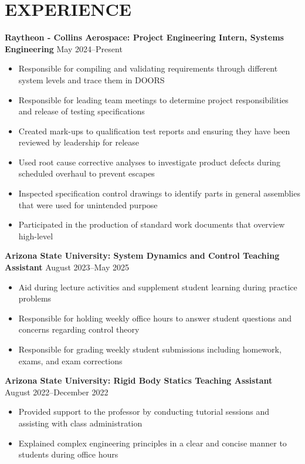 \documentclass{article}
\begin{document}
	\section{EXPERIENCE}
	\textbf{Raytheon - Collins Aerospace: Project Engineering Intern, Systems Engineering}
	\hfill
	\vspace{0.5em}
	May 2024--Present
	\begin{itemize}
		\item{ Responsible for compiling and validating requirements through different system levels and trace them in DOORS}
		\item{ Responsible for leading team meetings to determine project responsibilities and release of testing specifications}
		\item{ Created mark-ups to qualification test reports and ensuring they have been reviewed by leadership for release}
		\item{ Used root cause corrective analyses to investigate product defects during scheduled overhaul to prevent escapes}
		\item{ Inspected specification control drawings to identify parts in general assemblies that were used for unintended purpose}
		\item{ Participated in the production of standard work documents that overview high-level }
	\end{itemize}
	\vspace{1em}
	\textbf{Arizona State University: System Dynamics and Control Teaching Assistant}
	\hfill
	\vspace{0.5em}
	August 2023--May 2025
	\begin{itemize}
		\item{ Aid during lecture activities and supplement student learning during practice problems}
		\item{ Responsible for holding weekly office hours to answer student questions and concerns regarding control theory}
		\item{ Responsible for grading weekly student submissions including homework, exams, and exam corrections}
	\end{itemize}
	\vspace{1em}
	\textbf{Arizona State University: Rigid Body Statics Teaching Assistant}
	\hfill
	\vspace{0.5em}
	August 2022--December 2022
	\begin{itemize}
		\item{ Provided support to the professor by conducting tutorial sessions and assisting with class administration}
		\item{ Explained complex engineering principles in a clear and concise manner to students during office hours}
	\end{itemize}
	
\end{document}

